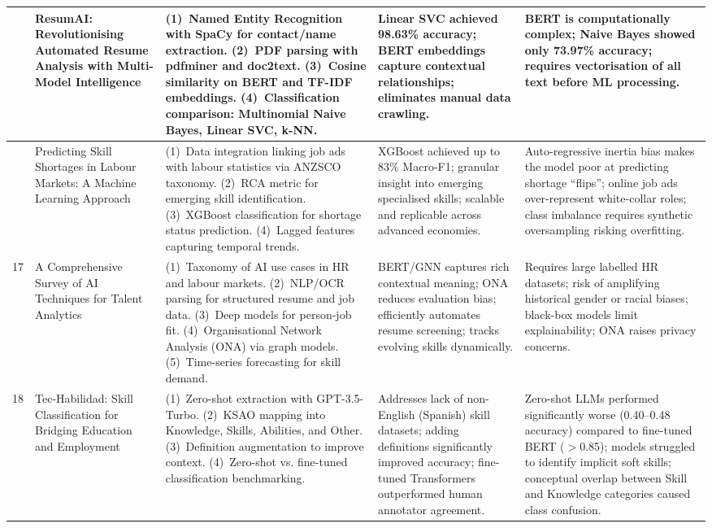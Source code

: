 \documentclass[12pt,a4paper]{report}
\begin{document}
\begin{longtable}{|>{\centering\arraybackslash}p{0.6cm}|p{3.1cm}|p{3.6cm}|p{3.2cm}|p{3.2cm}|}
15 &
ResumAI: Revolutionising Automated Resume Analysis with Multi-Model Intelligence \cite{ref15} &
(1)~Named Entity Recognition with SpaCy for contact/name extraction. (2)~PDF parsing with pdfminer and doc2text. (3)~Cosine similarity on BERT and TF-IDF embeddings. (4)~Classification comparison: Multinomial Naive Bayes, Linear SVC, k-NN. &
Linear SVC achieved 98.63\% accuracy; BERT embeddings capture contextual relationships; eliminates manual data crawling. &
BERT is computationally complex; Naive Bayes showed only 73.97\% accuracy; requires vectorisation of all text before ML processing. \\
\hline

16 &
Predicting Skill Shortages in Labour Markets: A Machine Learning Approach \cite{ref16} &
(1)~Data integration linking job ads with labour statistics via ANZSCO taxonomy. (2)~RCA metric for emerging skill identification. (3)~XGBoost classification for shortage status prediction. (4)~Lagged features capturing temporal trends. &
XGBoost achieved up to 83\% Macro-F1; granular insight into emerging specialised skills; scalable and replicable across advanced economies. &
Auto-regressive inertia bias makes the model poor at predicting shortage ``flips''; online job ads over-represent white-collar roles; class imbalance requires synthetic oversampling risking overfitting. \\
\hline

17 &
A Comprehensive Survey of AI Techniques for Talent Analytics \cite{ref17} &
(1)~Taxonomy of AI use cases in HR and labour markets. (2)~NLP/OCR parsing for structured resume and job data. (3)~Deep models for person-job fit. (4)~Organisational Network Analysis (ONA) via graph models. (5)~Time-series forecasting for skill demand. &
BERT/GNN captures rich contextual meaning; ONA reduces evaluation bias; efficiently automates resume screening; tracks evolving skills dynamically. &
Requires large labelled HR datasets; risk of amplifying historical gender or racial biases; black-box models limit explainability; ONA raises privacy concerns. \\
\hline

18 &
Tec-Habilidad: Skill Classification for Bridging Education and Employment \cite{ref18} &
(1)~Zero-shot extraction with GPT-3.5-Turbo. (2)~KSAO mapping into Knowledge, Skills, Abilities, and Other. (3)~Definition augmentation to improve context. (4)~Zero-shot vs. fine-tuned classification benchmarking. &
Addresses lack of non-English (Spanish) skill datasets; adding definitions significantly improved accuracy; fine-tuned Transformers outperformed human annotator agreement. &
Zero-shot LLMs performed significantly worse (0.40--0.48 accuracy) compared to fine-tuned BERT ($>$0.85); models struggled to identify implicit soft skills; conceptual overlap between Skill and Knowledge categories caused class confusion. \\
\hline


\end{longtable}
\end{document}
